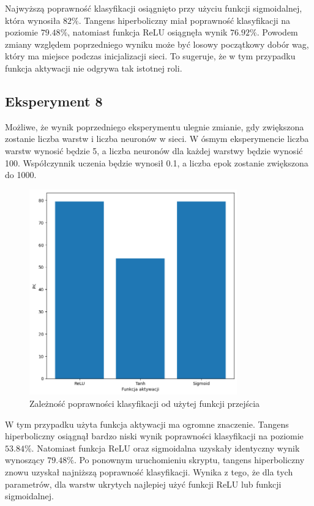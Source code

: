 \documentclass[a4paper]{article}
\begin{document}
Najwyższą poprawność klasyfikacji osiągnięto przy użyciu funkcji sigmoidalnej, która wynosiła $82\%$.
Tangens hiperboliczny miał poprawność klasyfikacji na poziomie $79.48\%$, natomiast funkcja ReLU osiągnęła wynik $76.92\%$.
Powodem zmiany względem poprzedniego wyniku może być losowy początkowy dobór wag, który ma miejsce podczas inicjalizacji sieci.
To sugeruje, że w tym przypadku funkcja aktywacji nie odgrywa tak istotnej roli.

\newpage
\subsection{Eksperyment 8}
Możliwe, że wynik poprzedniego eksperymentu ulegnie zmianie, gdy zwiększona zostanie liczba warstw i liczba neuronów w sieci.
W ósmym eksperymencie liczba warstw wynosić będzie 5, a liczba neuronów dla każdej warstwy będzie wynosić 100.
Współczynnik uczenia będzie wynosił 0.1, a liczba epok zostanie zwiększona do 1000.

\begin{figure}[H]
    \centering
    \includegraphics[width=0.8\textwidth, keepaspectratio]{pictures/ACTIVATION_2_1.png}
    \caption{Zależność poprawności klasyfikacji od użytej funkcji przejścia}
    \label{fig:activ_2}
\end{figure}

W tym przypadku użyta funkcja aktywacji ma ogromne znaczenie.
Tangens hiperboliczny osiągnął bardzo niski wynik poprawności klasyfikacji na poziomie $53.84\%$.
Natomiast funkcja ReLU oraz sigmoidalna uzyskały identyczny wynik wynoszący $79.48\%$.
Po ponownym uruchomieniu skryptu, tangens hiperboliczny znowu uzyskał najniższą poprawność klasyfikacji.
Wynika z tego, że dla tych parametrów, dla warstw ukrytych najlepiej użyć funkcji ReLU lub funkcji sigmoidalnej.
\end{document}
